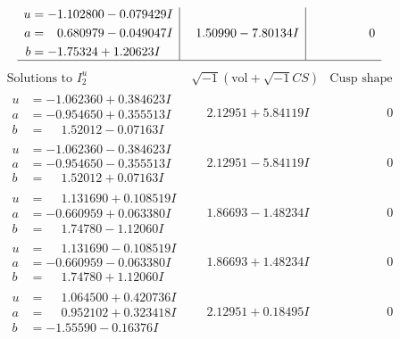 \documentclass[1p]{elsarticle_modified}
\theoremstyle{definition}
\newcommand{\I}{\sqrt{-1}}
\begin{document}
$$\begin{array}{c|c|c}
\begin{aligned}
u &= -1.102800 - 0.079429 I \\
a &= \phantom{-}0.680979 - 0.049047 I \\
b &= -1.75324 + 1.20623 I\end{aligned}
 & \phantom{-}1.50990 - 7.80134 I & \phantom{-0.000000 } 0\\
 \hline 
 \end{array}$$\newpage$$\begin{array}{c|c|c}  
\text{Solutions to }I^u_{2}& \I (\text{vol} + \sqrt{-1}CS) & \text{Cusp shape}\\
 \hline 
\begin{aligned}
u &= -1.062360 + 0.384623 I \\
a &= -0.954650 + 0.355513 I \\
b &= \phantom{-}1.52012 - 0.07163 I\end{aligned}
 & \phantom{-}2.12951 + 5.84119 I & \phantom{-0.000000 } 0 \\ \hline\begin{aligned}
u &= -1.062360 - 0.384623 I \\
a &= -0.954650 - 0.355513 I \\
b &= \phantom{-}1.52012 + 0.07163 I\end{aligned}
 & \phantom{-}2.12951 - 5.84119 I & \phantom{-0.000000 } 0 \\ \hline\begin{aligned}
u &= \phantom{-}1.131690 + 0.108519 I \\
a &= -0.660959 + 0.063380 I \\
b &= \phantom{-}1.74780 - 1.12060 I\end{aligned}
 & \phantom{-}1.86693 - 1.48234 I & \phantom{-0.000000 } 0 \\ \hline\begin{aligned}
u &= \phantom{-}1.131690 - 0.108519 I \\
a &= -0.660959 - 0.063380 I \\
b &= \phantom{-}1.74780 + 1.12060 I\end{aligned}
 & \phantom{-}1.86693 + 1.48234 I & \phantom{-0.000000 } 0 \\ \hline\begin{aligned}
u &= \phantom{-}1.064500 + 0.420736 I \\
a &= \phantom{-}0.952102 + 0.323418 I \\
b &= -1.55590 - 0.16376 I\end{aligned}
 & \phantom{-}2.12951 + 0.18495 I & \phantom{-0.000000 } 0 \\ \hline\begin{aligned}

\end{aligned}
\end{array}$$
\end{document}
